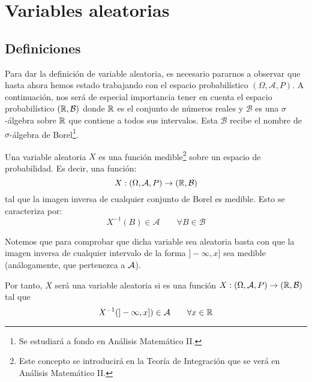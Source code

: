 \chapter{Variables aleatorias}
\section{Definiciones}


Para dar la definición de variable aleatoria, es necesario pararnos a observar que hasta ahora hemos estado trabajando con el espacio probabilístico $(\Omega, \mathcal{A}, P)$.
A continuación, nos será de especial importancia tener en cuenta el espacio probabilístico $(\mathbb R, \mathcal{B})$ donde $\mathbb R$ es el conjunto de números reales y $\mathcal{B}$ es una $\sigma$-álgebra sobre $\mathbb R$ que contiene a todos sus intervalos.
Esta $\mathcal{B}$ recibe el nombre de $\sigma$-álgebra de Borel\footnote{Se estudiará a fondo en Análisis Matemático II.}.

\begin{definicion}
    Una variable aleatoria $X$ es una función medible\footnote{Este concepto se introducirá en la Teoría de Integración que se verá en Análisis Matemático II.} sobre un espacio de probabilidad. 
    Es decir, una función:
    $$X:(\Omega, \mathcal{A}, P) \rightarrow (\mathbb R, \mathcal{B})$$
    tal que la imagen inversa de cualquier conjunto de Borel es medible. Esto se caracteriza por:
    $$X^{-1}(B) \in \mathcal{A} \qquad \forall B \in \mathcal{B}$$
\end{definicion}

Notemos que para comprobar que dicha variable sea aleatoria basta con que la imagen inversa de cualquier intervalo de la forma $]-\infty, x]$ sea medible (análogamente, que pertenezca a $\mathcal{A}$).

Por tanto, $X$ será una variable aleatoria si es una función $X :(\Omega, \mathcal{A}, P) \rightarrow (\mathbb R, \mathcal{B})$ tal que
$$X^{-1}(]-\infty, x]) \in \mathcal{A} \qquad \forall x \in \mathbb R$$

